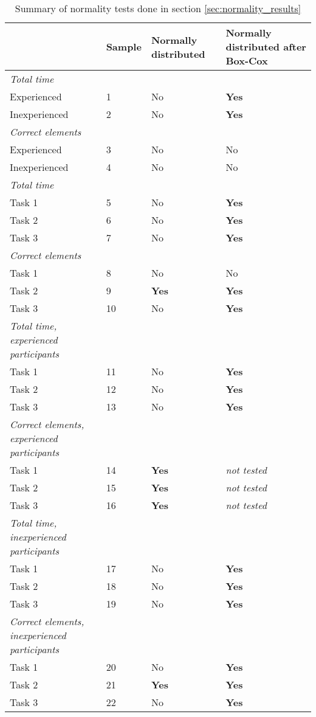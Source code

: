 	\begin{longtable}{p{}|l|p{2cm}|p{}}
	\caption[Summary, normality tests]{Summary of normality tests done in section \ref{sec:normality_results}} \label{tab:normaltest_summary} \\
		  & Sample & Normally distributed  & Normally distributed after Box-Cox  \\ \hline
		\textit{Total time} & & & \\
		Experienced & 1 &No   & \textbf{Yes}   \\
		Inexperienced  & 2 & No & \textbf{Yes}     \\ \hline
		\textit{Correct elements} & & & \\
		Experienced & 3 & No  & No   \\
		Inexperienced  & 4 & No & No   \\ \hline
		\textit{Total time }& & & \\
		Task 1 & 5 &No  & \textbf{Yes}  \\
		Task 2 & 6 &No  & \textbf{Yes}   \\
		Task 3 & 7 & No & \textbf{Yes}  \\ \hline
		\textit{Correct elements} & & & \\
		Task 1 & 8 & No  & No  \\
		Task 2 & 9 &\textbf{Yes}  & \textbf{Yes}   \\
		Task 3 & 10 & No & \textbf{Yes}  \\ \hline
		\textit{Total time, experienced participants} & & & \\
		Task 1 & 11 & No  & \textbf{Yes}  \\
		Task 2 & 12 & No  & \textbf{Yes}   \\
		Task 3 & 13 & No & \textbf{Yes}  \\ \hline
		\textit{Correct elements, experienced participants} & & & \\
		Task 1 & 14 & \textbf{Yes}  & \textit{not tested} \\
		Task 2 & 15 & \textbf{Yes}  &  \textit{not tested} \\
		Task 3 & 16 & \textbf{Yes} & \textit{not tested} \\ \hline
		\textit{Total time, inexperienced participants} & & & \\
		Task 1 & 17& No  & \textbf{Yes}  \\
		Task 2 & 18 & No  & \textbf{Yes}   \\
		Task 3 & 19 & No & \textbf{Yes}  \\ \hline
		\textit{Correct elements, inexperienced participants} & & & \\
		Task 1 & 20 & No  & \textbf{Yes} \\
		Task 2 & 21 & \textbf{Yes}  & \textbf{Yes} \\
		Task 3 & 22 & No & \textbf{Yes} \\ \hline
	\end{longtable}

